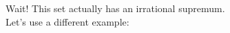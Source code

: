 \documentclass[preview]{standalone}
\begin{document}
\begin{center}
Wait! This set actually has an irrational supremum.\\Let's use a different example:
\end{center}
\end{document}
